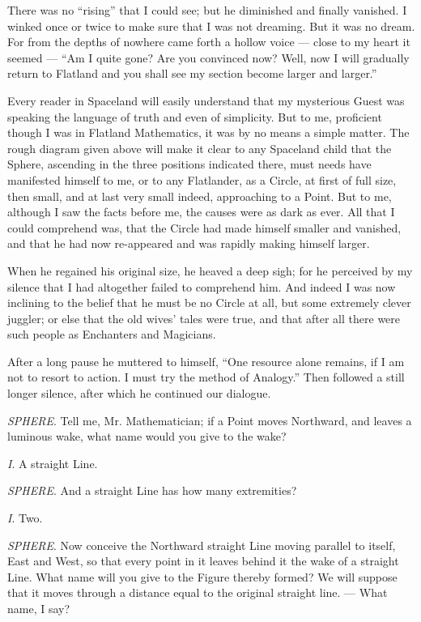 \documentclass[10pt, kindle, oneside]{kindle}
\begin{document}
There was no ``rising'' that I could see; but he diminished and finally
vanished. I winked once or twice to make sure that I was not dreaming. But it
was no dream. For from the depths of nowhere came forth a hollow voice --- close
to my heart it seemed --- ``Am I quite gone? Are you convinced now? Well, now I
will gradually return to Flatland and you shall see my section become larger
and larger.''

Every reader in Spaceland will easily understand that my mysterious Guest was
speaking the language of truth and even of simplicity. But to me, proficient
though I was in Flatland Mathematics, it was by no means a simple matter. The
rough diagram given above will make it clear to any Spaceland child that the
Sphere, ascending in the three positions indicated there, must needs have
manifested himself to me, or to any Flatlander, as a Circle, at first of full
size, then small, and at last very small indeed, approaching to a Point. But
to me, although I saw the facts before me, the causes were as dark as ever.
All that I could comprehend was, that the Circle had made himself smaller and
vanished, and that he had now re-appeared and was rapidly making himself
larger.

When he regained his original size, he heaved a deep sigh; for he perceived by
my silence that I had altogether failed to comprehend him. And indeed I was
now inclining to the belief that he must be no Circle at all, but some
extremely clever juggler; or else that the old wives' tales were true, and
that after all there were such people as Enchanters and Magicians.

After a long pause he muttered to himself, ``One resource alone remains, if I
am not to resort to action. I must try the method of Analogy.'' Then followed a
still longer silence, after which he continued our dialogue.

\emph{SPHERE}. Tell me, Mr. Mathematician; if a Point moves Northward, and leaves a
luminous wake, what name would you give to the wake?

\emph{I}. A straight Line.

\emph{SPHERE}. And a straight Line has how many extremities?

\emph{I}. Two.

\emph{SPHERE}. Now conceive the Northward straight Line moving parallel to itself,
East and West, so that every point in it leaves behind it the wake of a
straight Line. What name will you give to the Figure thereby formed? We will
suppose that it moves through a distance equal to the original straight line.
--- What name, I say?
\end{document}
